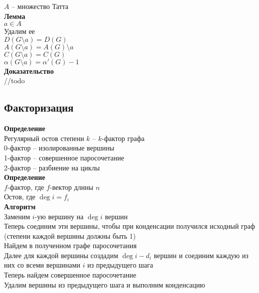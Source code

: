 \documentclass[12pt]{article}
\begin{document}
$A$ -- множество Татта\\
\textbf{Лемма}\\
$a \in A$\\
Удалим ее\\
$D(G\setminus a) = D(G)$\\
$A(G\setminus a) = A(G)\setminus a$\\
$C(G\setminus a) = C(G)$\\
$\alpha(G\setminus a) = \alpha'(G)-1$\\
\textbf{Доказательство}\\
//todo
\subsection{Факторизация}
\textbf{Определение}\\
Регулярный остов степени $k$ -- $k$-фактор графа\\
0-фактор -- изолированные вершины\\
1-фактор -- совершенное паросочетание\\
2-фактор -- разбиение на циклы\\
\textbf{Определение}\\
$f$-фактор, где $f$-вектор длины $n$\\
Остов, где $\deg i = f_i$\\
\textbf{Алгоритм}\\
Заменим $i$-ую вершину на $\deg i$ вершин\\
Теперь соединим эти вершины, чтобы при конденсации получился исходный граф (степени каждой вершины должны быть 1)\\
Найдем в полученном графе паросочетания\\
Далее для каждой вершины создадим $\deg i - d_i$ вершин и соединим каждую из них со всеми вершинами $i$ из предыдущего шага\\
Теперь найдем совершенное паросочетание\\
Удалим вершины из предыдущего шага и выполним конденсацию\\
\end{document}
